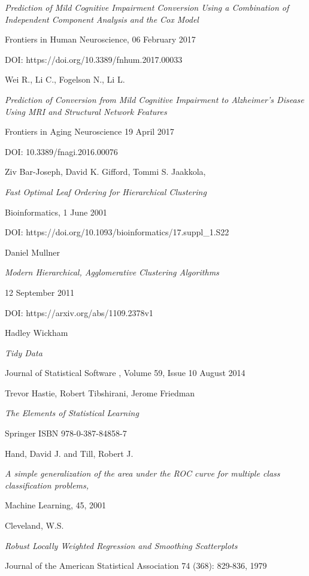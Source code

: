 \documentclass[12pt,openright,twoside,a4paper]{book}
\begin{document}
\begin{thebibliography}{99}
\emph{Prediction of Mild Cognitive Impairment Conversion Using a Combination of Independent Component Analysis and the Cox Model}

Frontiers in Human Neuroscience, 06 February 2017

DOI:  https://doi.org/10.3389/fnhum.2017.00033

Wei R., Li C., Fogelson N., Li L.

\emph{Prediction of Conversion from Mild Cognitive Impairment to Alzheimer's Disease Using MRI and Structural Network Features}

Frontiers in Aging Neuroscience  19 April 2017

DOI: 10.3389/fnagi.2016.00076

Ziv Bar-Joseph, David K. Gifford, Tommi S. Jaakkola, 

\emph{Fast Optimal Leaf Ordering for Hierarchical Clustering}

 Bioinformatics, 1 June 2001
 
 DOI: https://doi.org/10.1093/bioinformatics/17.suppl\_1.S22
 
 Daniel Mullner
 
\emph{Modern Hierarchical, Agglomerative Clustering Algorithms} 

12 September 2011

DOI: https://arxiv.org/abs/1109.2378v1

Hadley Wickham

\emph{Tidy Data}

Journal of Statistical Software , Volume 59, Issue 10 August 2014

Trevor Hastie, Robert Tibshirani, Jerome Friedman

\emph{The Elements of Statistical Learning}

Springer ISBN 978-0-387-84858-7

Hand, David J. and Till, Robert J.

\emph{A simple generalization of the area under the ROC curve for multiple class classification problems,}

Machine Learning, 45, 2001

Cleveland, W.S. 

\emph{Robust Locally Weighted Regression and Smoothing Scatterplots}

Journal of the American Statistical Association 74 (368): 829-836, 1979



 \end{thebibliography}
 
 
\end{document}
